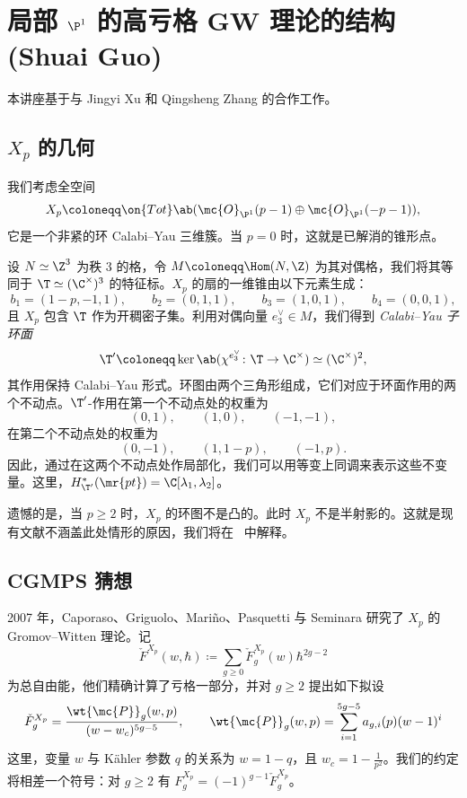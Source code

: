 \section{\texorpdfstring{局部 \(\P^1\) 的高亏格 GW 理论的结构}{局部 P1 的高亏格 GW 理论的结构} (Shuai Guo)}%
\label{sec:Structure of higher-genus GW theory of local P1 (Shuai Guo)}

本讲座基于与 Jingyi Xu 和 Qingsheng Zhang 的合作工作。

\subsection{\(X_p\) 的几何}%
\label{sub:The geometry of Xp}

我们考虑全空间
\[ X_p \coloneqq \on{Tot}\ab(\mc{O}_{\P^1}(p-1) \oplus \mc{O}_{\P^1}(-p-1)), \]
它是一个非紧的环 Calabi--Yau 三维簇。当 \(p = 0\) 时，这就是已解消的锥形点。

设 \(N \simeq \Z^3\) 为秩 \(3\) 的格，令 \(M \coloneqq \Hom(N,\Z)\) 为其对偶格，我们将其等同于 \(\T \simeq (\C^{\times})^3\) 的特征标。\(X_p\) 的扇的一维锥由以下元素生成：
\[ b_1 = (1-p,-1,1), \qquad b_2 = (0,1,1), \qquad b_3 = (1,0,1), \qquad b_4 = (0,0,1), \]
且 \(X_p\) 包含 \(\T\) 作为开稠密子集。利用对偶向量 \(e_3^{\vee} \in M\)，我们得到 \textit{Calabi--Yau 子环面}
\[ \T' \coloneqq \ker\ab(\chi^{e_3^{\vee}} \colon \T \to \C^{\times}) \simeq (\C^{\times})^2, \]
其作用保持 Calabi--Yau 形式。环图由两个三角形组成，它们对应于环面作用的两个不动点。\(\T'\)-作用在第一个不动点处的权重为
\[ (0,1), \qquad (1,0), \qquad (-1,-1), \]
在第二个不动点处的权重为
\[ (0,-1), \qquad (1,1-p), \qquad (-1,p). \]
因此，通过在这两个不动点处作局部化，我们可以用等变上同调来表示这些不变量。这里，\(H^*_{\T'}(\mr{pt}) = \C[\lambda_1,\lambda_2]\)。

遗憾的是，当 \(p \geq 2\) 时，\(X_p\) 的环图不是凸的。此时 \(X_p\) 不是半射影的。这就是现有文献不涵盖此处情形的原因，我们将在~ 中解释。

\subsection{CGMPS 猜想}%
\label{sub:The conjecture of CGMPS}

2007 年，Caporaso、Griguolo、Mari\~{n}o、Pasquetti 与 Seminara 研究了 \(X_p\) 的 Gromov--Witten 理论。记
\[ \check{F}^{X_p}(w,\hbar) \coloneqq \sum_{g \geq 0} \check{F}_g^{X_p}(w) \hbar^{2g-2} \]
为总自由能，他们精确计算了亏格一部分，并对 \(g \geq 2\) 提出如下拟设
\begin{equation}\label{eqn:cgmps ansatz}
    \check{F}_g^{X_p} = \frac{\wt{\mc{P}}_g(w,p)}{(w-w_c)^{5g-5}}, \qquad \wt{\mc{P}}_g(w,p) = \sum_{i=1}^{5g-5} a_{g,i}(p)(w-1)^i
\end{equation}
这里，变量 \(w\) 与 Kähler 参数 \(q\) 的关系为 \(w = 1-q\)，且 \(w_c = 1 - \frac{1}{p^2}\)。我们的约定将相差一个符号：对 \(g \geq 2\) 有 \(F_g^{X_p} = (-1)^{g-1}\check{F}_g^{X_p}\)。

